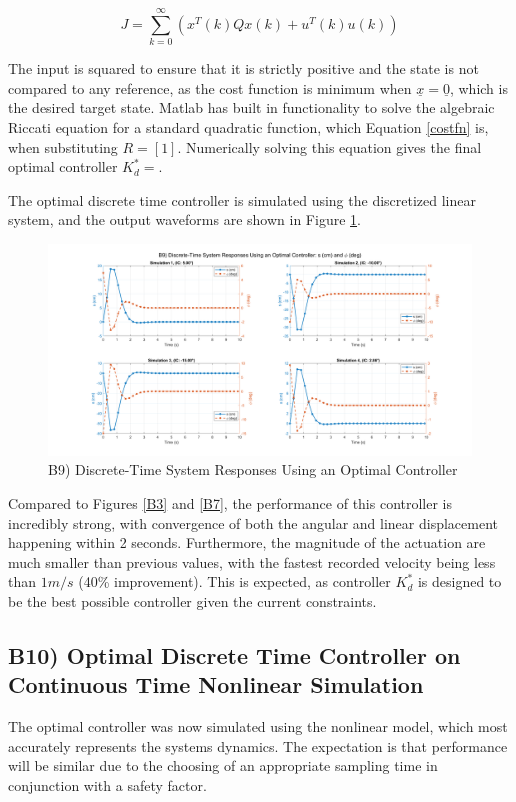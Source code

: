 \documentclass{article}
\begin{document}
\begin{equation}\label{costfn}
    J = \sum_{k=0}^{\infty} \left( x^T(k) Q x(k) + u^T(k) u(k) \right)
\end{equation}

The input is squared to ensure that it is strictly positive and the state is not compared to any reference, as the cost function is minimum when $\underline{x}=\underline{0}$, which is the desired target state. Matlab has built in functionality to solve the algebraic Riccati equation for a standard quadratic function, which Equation \ref{costfn} is, when substituting $R=[1]$. Numerically solving this equation gives the final optimal controller $K^*_d=$.
\newline

The optimal discrete time controller is simulated using the discretized linear system, and the output waveforms are shown in Figure \ref{B9}.

\begin{figure}[H]
    \centering
    \includegraphics[width=\textwidth]{figures/b9.png}
    \caption{B9) Discrete-Time System Responses Using an Optimal Controller}
    \label{B9}
\end{figure}

Compared to Figures \ref{B3} and \ref{B7}, the performance of this controller is incredibly strong, with convergence of both the angular and linear displacement happening within 2 seconds. Furthermore, the magnitude of the actuation are much smaller than previous values, with the fastest recorded velocity being less than $1 m/s$ (40\% improvement). This is expected, as controller $K^*_d$ is designed to be the best possible controller given the current constraints.

\subsection*{B10) Optimal Discrete Time Controller on Continuous Time Nonlinear Simulation}
The optimal controller was now simulated using the nonlinear model, which most accurately represents the systems dynamics. The expectation is that performance will be similar due to the choosing of an appropriate sampling time in conjunction with a safety factor.
\end{document}
